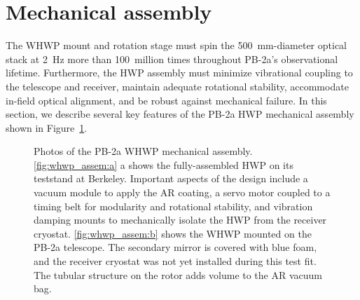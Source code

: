 
\section{Mechanical assembly}
\label{sec:pb2a_whwp_mechanical_assembly}

The WHWP mount and rotation stage must spin the 500~mm-diameter optical stack at 2~Hz more than 100~million times throughout PB-2a's observational lifetime. Furthermore, the HWP assembly must minimize vibrational coupling to the telescope and receiver, maintain adequate rotational stability, accommodate in-field optical alignment, and be robust against mechanical failure. In this section, we describe several key features of the PB-2a HWP mechanical assembly shown in Figure~\ref{fig:whwp_assem}.

\begin{figure}[!t]
    \centering
    \caption[Photos of the PB-2a WHWP mechanical assembly.]{Photos of the PB-2a WHWP mechanical assembly. \ref{fig:whwp_assem:a} a shows the fully-assembled HWP on its teststand at Berkeley. Important aspects of the design include a vacuum module to apply the AR coating, a servo motor coupled to a timing belt for modularity and rotational stability, and vibration damping mounts to mechanically isolate the HWP from the receiver cryostat. \ref{fig:whwp_assem:b} shows the WHWP mounted on the PB-2a telescope. The secondary mirror is covered with blue foam, and the receiver cryostat was not yet installed during this test fit. The tubular structure on the rotor adds volume to the AR vacuum bag.}
    \label{fig:whwp_assem}
\end{figure}

